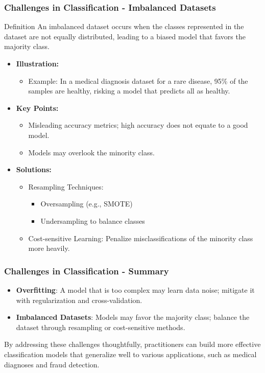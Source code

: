 \documentclass[aspectratio=169]{beamer}
\begin{document}
\begin{frame}[fragile]
  \frametitle{Challenges in Classification - Imbalanced Datasets}
  \begin{block}{Definition}
    An imbalanced dataset occurs when the classes represented in the dataset are not equally distributed, leading to a biased model that favors the majority class.
  \end{block}

  \begin{itemize}
    \item \textbf{Illustration:}
      \begin{itemize}
        \item Example: In a medical diagnosis dataset for a rare disease, 95\% of the samples are healthy, risking a model that predicts all as healthy.
      \end{itemize}
    
    \item \textbf{Key Points:}
      \begin{itemize}
        \item Misleading accuracy metrics; high accuracy does not equate to a good model.
        \item Models may overlook the minority class.
      \end{itemize}
    
    \item \textbf{Solutions:}
      \begin{itemize}
        \item Resampling Techniques:
          \begin{itemize}
            \item Oversampling (e.g., SMOTE)
            \item Undersampling to balance classes
          \end{itemize}
        \item Cost-sensitive Learning: Penalize misclassifications of the minority class more heavily.
      \end{itemize}
  \end{itemize}
\end{frame}

\begin{frame}[fragile]
  \frametitle{Challenges in Classification - Summary}
  \begin{itemize}
    \item \textbf{Overfitting}: A model that is too complex may learn data noise; mitigate it with regularization and cross-validation.
    \item \textbf{Imbalanced Datasets}: Models may favor the majority class; balance the dataset through resampling or cost-sensitive methods.
  \end{itemize}
  
  By addressing these challenges thoughtfully, practitioners can build more effective classification models that generalize well to various applications, such as medical diagnoses and fraud detection.
\end{frame}
\end{document}
